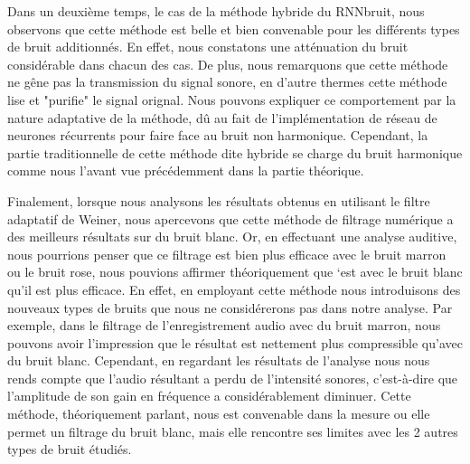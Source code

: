 \documentclass[conference,onecolumn]{IEEEtran}
\begin{document}
Dans un deuxième temps, le cas de la méthode hybride du RNNbruit, nous observons que cette méthode est belle et bien convenable pour les différents types de bruit additionnés. En effet, nous constatons une atténuation du bruit considérable dans chacun des cas. De plus, nous remarquons que cette méthode ne gêne pas la transmission du signal sonore, en d'autre thermes cette méthode lise et "purifie" le signal orignal. Nous pouvons expliquer ce comportement par la nature adaptative de la méthode, dû au fait de l'implémentation de réseau de neurones récurrents pour faire face au bruit non harmonique. Cependant, la partie traditionnelle de cette méthode dite hybride se charge du bruit harmonique comme nous l'avant vue précédemment dans la partie théorique.

Finalement, lorsque nous analysons les résultats obtenus en utilisant le filtre adaptatif de Weiner, nous apercevons que cette méthode de filtrage numérique a des meilleurs résultats sur du bruit blanc. Or, en effectuant une analyse auditive, nous pourrions penser que ce filtrage est bien plus efficace avec le bruit marron ou le bruit rose, nous pouvions affirmer théoriquement que ‘est avec le bruit blanc qu’il est plus efficace. En effet, en employant cette méthode nous introduisons des nouveaux types de bruits que nous ne considérerons pas dans notre analyse. Par exemple, dans le filtrage de l’enregistrement audio avec du bruit marron, nous pouvons avoir l’impression que le résultat est nettement plus compressible qu’avec du bruit blanc. Cependant, en regardant les résultats de l’analyse nous nous rends compte que l’audio résultant a perdu de l’intensité sonores, c’est-à-dire que l’amplitude de son gain en fréquence a considérablement diminuer. Cette méthode, théoriquement parlant, nous est convenable dans la mesure ou elle permet un filtrage du bruit blanc, mais elle rencontre ses limites avec les 2 autres types de bruit étudiés.
\end{document}
